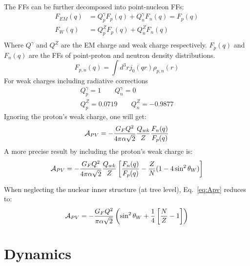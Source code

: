 The FFs can be further decomposed into point-nucleon FFs:
\begin{equation}
    \begin{aligned}
	F_{EM}(q) &= Q^\gamma_p F_p(q) + Q^\gamma_n F_n(q)  = F_p(q)	\\
	F_{W}(q)  &= Q^Z_p F_p(q) + Q^Z_n F_n(q)  \\
    \end{aligned}
\end{equation}
Where $Q^\gamma$ and $Q^Z$ are the EM charge and weak charge respectively.
$F_p(q)$ and $F_n(q)$ are the FFs of point-proton and neutron density distributions. 
\begin{equation}
    F_{p,n}(q) = \int d^3r j_0(qr) \rho_{p,n}(r)
\end{equation}
For weak charges including radiative corrections
\begin{equation}
    \begin{gathered}
	Q^\gamma_p = 1  \qquad Q^\gamma_n = 0   \\
	Q^Z_p = 0.0719    \qquad Q^Z_n = -0.9877
    \end{gathered}
\end{equation}
Ignoring the proton's weak charge, one will get:
\begin{equation}
    \mathcal{A}_{PV} = -\frac{G_FQ^2}{4\pi\alpha\sqrt{2}}\frac{Q_{wk}}{Z} \frac{F_n(q)}{F_p(q)} 
\end{equation}
A more precise result by including the proton's weak charge is:
\begin{equation}
    \mathcal{A}_{PV} = -\frac{G_FQ^2}{4\pi\alpha\sqrt{2}}\frac{Q_{wk}}{Z}\left[ \frac{F_n(q)}{F_p(q)} - \frac{Z}{N}(1-4\sin^2\theta_W) \right]
    \label{eq:Apv}
\end{equation}

When neglecting the nuclear inner structure (at tree level), Eq.~\ref{eq:Apv} reduces to:
\begin{equation}
    \mathcal{A}_{PV} = -\frac{G_F Q^2}{\pi\alpha\sqrt{2}} \left(\sin^2\theta_W + \frac{1}{4}\left[ \frac{N}{Z} - 1 \right] \right)
\end{equation}

\section{Dynamics}
\begin{center}
\end{center}

